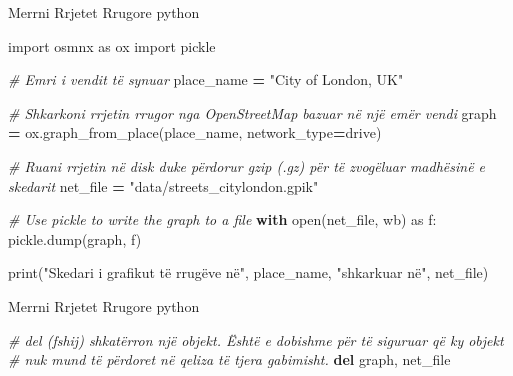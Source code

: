\documentclass[
  ignorenonframetext,
]{beamer}
\newenvironment{Shaded}{\begin{snugshade}}{\end{snugshade}}
\newcommand{\BuiltInTok}[1]{#1}
\newcommand{\CommentTok}[1]{\textcolor[rgb]{0.56,0.35,0.01}{\textit{#1}}}
\newcommand{\ControlFlowTok}[1]{\textcolor[rgb]{0.13,0.29,0.53}{\textbf{#1}}}
\newcommand{\ImportTok}[1]{#1}
\newcommand{\KeywordTok}[1]{\textcolor[rgb]{0.13,0.29,0.53}{\textbf{#1}}}
\newcommand{\NormalTok}[1]{#1}
\newcommand{\OperatorTok}[1]{\textcolor[rgb]{0.81,0.36,0.00}{\textbf{#1}}}
\newcommand{\StringTok}[1]{\textcolor[rgb]{0.31,0.60,0.02}{#1}}
\begin{document}
\begin{frame}[fragile]{Merrni Rrjetet Rrugore}
\protect\hypertarget{merrni-rrjetet-rrugore}{}
python

\begin{Shaded}
\begin{Highlighting}[]
\ImportTok{import}\NormalTok{ osmnx }\ImportTok{as}\NormalTok{ ox}
\ImportTok{import}\NormalTok{ pickle}

\CommentTok{\# Emri i vendit të synuar}
\NormalTok{place\_name }\OperatorTok{=} \StringTok{"City of London, UK"}

\CommentTok{\# Shkarkoni rrjetin rrugor nga OpenStreetMap bazuar në një emër vendi}
\NormalTok{graph }\OperatorTok{=}\NormalTok{ ox.graph\_from\_place(place\_name, network\_type}\OperatorTok{=}\StringTok{\textquotesingle{}drive\textquotesingle{}}\NormalTok{)}

\CommentTok{\# Ruani rrjetin në disk duke përdorur gzip (.gz) për të zvogëluar madhësinë e skedarit}
\NormalTok{net\_file }\OperatorTok{=} \StringTok{"data/streets\_citylondon.gpik"}

\CommentTok{\# Use pickle to write the graph to a file}
\ControlFlowTok{with} \BuiltInTok{open}\NormalTok{(net\_file, }\StringTok{\textquotesingle{}wb\textquotesingle{}}\NormalTok{) }\ImportTok{as}\NormalTok{ f:}
\NormalTok{    pickle.dump(graph, f)}

\BuiltInTok{print}\NormalTok{(}\StringTok{"Skedari i grafikut të rrugëve në"}\NormalTok{, place\_name, }\StringTok{"shkarkuar në"}\NormalTok{, net\_file)}
\end{Highlighting}
\end{Shaded}
\end{frame}

\begin{frame}[fragile]{Merrni Rrjetet Rrugore}
\protect\hypertarget{merrni-rrjetet-rrugore-1}{}
python

\begin{Shaded}
\begin{Highlighting}[]
\CommentTok{\# \textquotesingle{}del\textquotesingle{} (fshij) shkatërron një objekt. Është e dobishme për të siguruar që ky objekt}
\CommentTok{\# nuk mund të përdoret në qeliza të tjera gabimisht.}
\KeywordTok{del}\NormalTok{ graph, net\_file}
\end{Highlighting}
\end{Shaded}
\end{frame}
\end{document}
